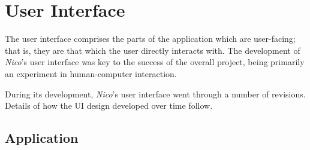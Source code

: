 \documentclass[12pt,twoside,notitlepage,xetex]{report}
\begin{document}
%
%
\section{User Interface}%

The user interface comprises the parts of the application which are user-facing; that is, they are that which the user directly interacts with.  The development of \emph{Nico}'s user interface was key to the success of the overall project, being primarily an experiment in human-computer interaction.

During its development, \emph{Nico}'s user interface went through a number of revisions.  Details of how the UI design developed over time follow.

\subsection{Application}
\end{document}
